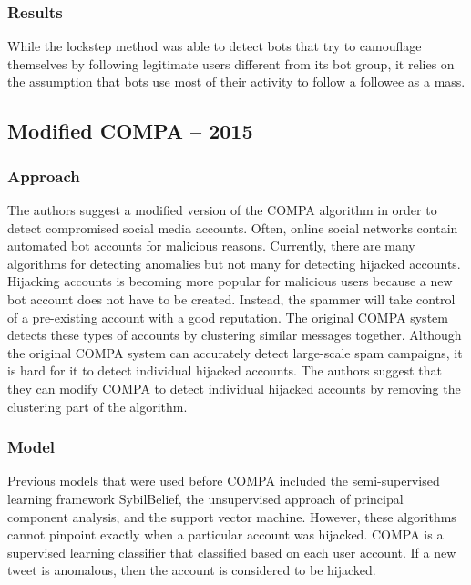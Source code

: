 \documentclass[11pt, oneside]{article}   	%
\begin{document}
\subsubsection*{Results}

\quad While the lockstep method was able to detect bots that try to camouflage themselves by following legitimate users different from its bot group, it relies on the assumption that bots use most of their activity to follow a followee as a mass.

\subsection*{Modified COMPA -- 2015}

\subsubsection*{Approach}

\quad The authors suggest a modified version of the COMPA algorithm in order to detect compromised social media accounts.
Often, online social networks contain automated bot accounts for malicious reasons.
Currently, there are many algorithms for detecting anomalies but not many for detecting hijacked accounts.
Hijacking accounts is becoming more popular for malicious users because a new bot account does not have to be created.
Instead, the spammer will take control of a pre-existing account with a good reputation.
The original COMPA system detects these types of accounts by clustering similar messages together.
Although the original COMPA system can accurately detect large-scale spam campaigns, it is hard for it to detect individual hijacked accounts.
The authors suggest that they can modify COMPA to detect individual hijacked accounts by removing the clustering part of the algorithm.

\subsubsection*{Model}

\quad Previous models that were used before COMPA included the semi-supervised learning framework SybilBelief, the unsupervised approach of principal component analysis, and the support vector machine.
However, these algorithms cannot pinpoint exactly when a particular account was hijacked.
COMPA is a supervised learning classifier that classified based on each user account.
If a new tweet is anomalous, then the account is considered to be hijacked.
\end{document}
